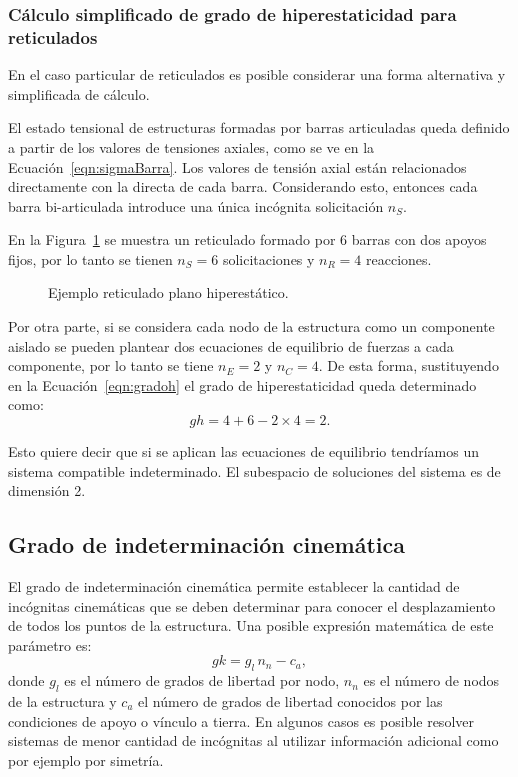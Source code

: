 {\cambio 
\subsubsection{Cálculo simplificado de grado de hiperestaticidad para reticulados}

En el caso particular de reticulados es posible considerar una forma alternativa y simplificada de cálculo. %
}
% 
El estado tensional de estructuras formadas por barras articuladas queda definido a partir de los valores de tensiones axiales, como se ve en la Ecuación~\ref{eqn:sigmaBarra}. %
%
Los valores de tensión axial están relacionados directamente con la directa de cada barra. %
%
Considerando esto, entonces cada barra bi-articulada introduce una única incógnita solicitación $n_S$.

En la Figura~\ref{fig:retic_gh} se muestra un reticulado formado por 6 barras con dos apoyos fijos, por lo tanto se tienen $n_S=6$ solicitaciones y $n_R=4$ reacciones. %

\begin{figure}[htb]
	\centering
	\def\svgwidth{0.6\textwidth}
	
	\caption{Ejemplo reticulado plano hiperestático.}
	\label{fig:retic_gh}
\end{figure}

Por otra parte, si se considera cada nodo de la estructura como un componente aislado se pueden plantear dos ecuaciones de equilibrio de fuerzas a cada componente, por lo tanto se tiene $n_E = 2$ y $n_C =4$. %
%
De esta forma, sustituyendo en la Ecuación~\ref{eqn:gradoh} el grado de hiperestaticidad queda determinado como:
%
\begin{equation}
gh = 4 + 6 - 2 \times 4 = 2.
\end{equation}

Esto quiere decir que si se aplican las ecuaciones de equilibrio tendríamos un sistema compatible indeterminado. El subespacio de soluciones del sistema es de dimensión 2.




\subsection{Grado de indeterminación cinemática}

El grado de indeterminación cinemática permite establecer la cantidad de incógnitas cinemáticas que se deben determinar para conocer el desplazamiento de todos los puntos de la estructura.
%
Una posible expresión matemática de este parámetro es:
%
\begin{equation}
gk = g_l \, n_n - c_a,
\end{equation}
%
donde $g_l$ es el número de grados de libertad por nodo, $n_n$ es el número de nodos de la estructura y $c_a$ el número de grados de libertad conocidos por las condiciones de apoyo o vínculo a tierra. %
%
En algunos casos es posible resolver sistemas de menor cantidad de incógnitas al utilizar información adicional como por ejemplo por simetría.


